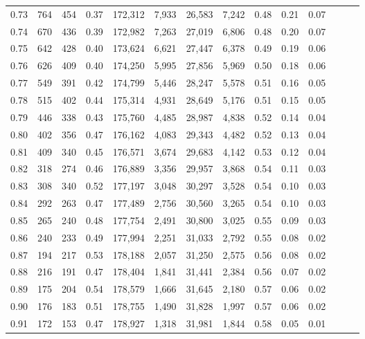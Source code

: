\begin{tabular}{rrrrrrrrrrrrrr}
0.73 &    764 &  454 &  0.37 &  172,312 &    7,933 &  26,583 &   7,242 &  0.48 &  0.21 &      0.07 \\
0.74 &    670 &  436 &  0.39 &  172,982 &    7,263 &  27,019 &   6,806 &  0.48 &  0.20 &      0.07 \\
0.75 &    642 &  428 &  0.40 &  173,624 &    6,621 &  27,447 &   6,378 &  0.49 &  0.19 &      0.06 \\
0.76 &    626 &  409 &  0.40 &  174,250 &    5,995 &  27,856 &   5,969 &  0.50 &  0.18 &      0.06 \\
0.77 &    549 &  391 &  0.42 &  174,799 &    5,446 &  28,247 &   5,578 &  0.51 &  0.16 &      0.05 \\
0.78 &    515 &  402 &  0.44 &  175,314 &    4,931 &  28,649 &   5,176 &  0.51 &  0.15 &      0.05 \\
0.79 &    446 &  338 &  0.43 &  175,760 &    4,485 &  28,987 &   4,838 &  0.52 &  0.14 &      0.04 \\
0.80 &    402 &  356 &  0.47 &  176,162 &    4,083 &  29,343 &   4,482 &  0.52 &  0.13 &      0.04 \\
0.81 &    409 &  340 &  0.45 &  176,571 &    3,674 &  29,683 &   4,142 &  0.53 &  0.12 &      0.04 \\
0.82 &    318 &  274 &  0.46 &  176,889 &    3,356 &  29,957 &   3,868 &  0.54 &  0.11 &      0.03 \\
0.83 &    308 &  340 &  0.52 &  177,197 &    3,048 &  30,297 &   3,528 &  0.54 &  0.10 &      0.03 \\
0.84 &    292 &  263 &  0.47 &  177,489 &    2,756 &  30,560 &   3,265 &  0.54 &  0.10 &      0.03 \\
0.85 &    265 &  240 &  0.48 &  177,754 &    2,491 &  30,800 &   3,025 &  0.55 &  0.09 &      0.03 \\
0.86 &    240 &  233 &  0.49 &  177,994 &    2,251 &  31,033 &   2,792 &  0.55 &  0.08 &      0.02 \\
0.87 &    194 &  217 &  0.53 &  178,188 &    2,057 &  31,250 &   2,575 &  0.56 &  0.08 &      0.02 \\
0.88 &    216 &  191 &  0.47 &  178,404 &    1,841 &  31,441 &   2,384 &  0.56 &  0.07 &      0.02 \\
0.89 &    175 &  204 &  0.54 &  178,579 &    1,666 &  31,645 &   2,180 &  0.57 &  0.06 &      0.02 \\
0.90 &    176 &  183 &  0.51 &  178,755 &    1,490 &  31,828 &   1,997 &  0.57 &  0.06 &      0.02 \\
0.91 &    172 &  153 &  0.47 &  178,927 &    1,318 &  31,981 &   1,844 &  0.58 &  0.05 &      0.01 \\

\end{tabular}
